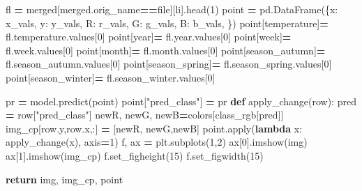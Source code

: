 \documentclass[
]{article}
\newenvironment{Shaded}{\begin{snugshade}}{\end{snugshade}}
\newcommand{\BuiltInTok}[1]{#1}
\newcommand{\ControlFlowTok}[1]{\textcolor[rgb]{0.13,0.29,0.53}{\textbf{#1}}}
\newcommand{\DecValTok}[1]{\textcolor[rgb]{0.00,0.00,0.81}{#1}}
\newcommand{\KeywordTok}[1]{\textcolor[rgb]{0.13,0.29,0.53}{\textbf{#1}}}
\newcommand{\NormalTok}[1]{#1}
\newcommand{\OperatorTok}[1]{\textcolor[rgb]{0.81,0.36,0.00}{\textbf{#1}}}
\newcommand{\StringTok}[1]{\textcolor[rgb]{0.31,0.60,0.02}{#1}}
\begin{document}
\begin{Shaded}
\begin{Highlighting}[]
\NormalTok{    fl }\OperatorTok{=}\NormalTok{ merged[merged.orig\_name}\OperatorTok{==}\BuiltInTok{file}\NormalTok{][li].head(}\DecValTok{1}\NormalTok{)}
\NormalTok{    point }\OperatorTok{=}\NormalTok{ pd.DataFrame(\{}\StringTok{\textquotesingle{}x\textquotesingle{}}\NormalTok{: x\_vals,}
     \StringTok{\textquotesingle{}y\textquotesingle{}}\NormalTok{: y\_vals,}
     \StringTok{\textquotesingle{}R\textquotesingle{}}\NormalTok{: r\_vals,}
     \StringTok{\textquotesingle{}G\textquotesingle{}}\NormalTok{: g\_vals,}
     \StringTok{\textquotesingle{}B\textquotesingle{}}\NormalTok{: b\_vals,}
\NormalTok{    \})}
\NormalTok{    point[}\StringTok{\textquotesingle{}temperature\textquotesingle{}}\NormalTok{]}\OperatorTok{=}\NormalTok{ fl.temperature.values[}\DecValTok{0}\NormalTok{]}
\NormalTok{    point[}\StringTok{\textquotesingle{}year\textquotesingle{}}\NormalTok{]}\OperatorTok{=}\NormalTok{ fl.year.values[}\DecValTok{0}\NormalTok{]}
\NormalTok{    point[}\StringTok{\textquotesingle{}week\textquotesingle{}}\NormalTok{]}\OperatorTok{=}\NormalTok{ fl.week.values[}\DecValTok{0}\NormalTok{]}
\NormalTok{    point[}\StringTok{\textquotesingle{}month\textquotesingle{}}\NormalTok{]}\OperatorTok{=}\NormalTok{ fl.month.values[}\DecValTok{0}\NormalTok{]}
\NormalTok{    point[}\StringTok{\textquotesingle{}season\_autumn\textquotesingle{}}\NormalTok{]}\OperatorTok{=}\NormalTok{ fl.season\_autumn.values[}\DecValTok{0}\NormalTok{]}
\NormalTok{    point[}\StringTok{\textquotesingle{}season\_spring\textquotesingle{}}\NormalTok{]}\OperatorTok{=}\NormalTok{ fl.season\_spring.values[}\DecValTok{0}\NormalTok{]}
\NormalTok{    point[}\StringTok{\textquotesingle{}season\_winter\textquotesingle{}}\NormalTok{]}\OperatorTok{=}\NormalTok{ fl.season\_winter.values[}\DecValTok{0}\NormalTok{]}
    
\NormalTok{    pr }\OperatorTok{=}\NormalTok{ model.predict(point)}
\NormalTok{    point[}\StringTok{"pred\_class"}\NormalTok{] }\OperatorTok{=}\NormalTok{ pr}
    \KeywordTok{def}\NormalTok{ apply\_change(row):}
\NormalTok{        pred }\OperatorTok{=}\NormalTok{ row[}\StringTok{"pred\_class"}\NormalTok{]}
\NormalTok{        newR, newG, newB}\OperatorTok{=}\NormalTok{colors[class\_rgb[pred]]}
\NormalTok{        img\_cp[row.y,row.x,:] }\OperatorTok{=}\NormalTok{ [newR, newG,newB]}
\NormalTok{    point.}\BuiltInTok{apply}\NormalTok{(}\KeywordTok{lambda}\NormalTok{ x: apply\_change(x), axis}\OperatorTok{=}\DecValTok{1}\NormalTok{)}
\NormalTok{    f, ax }\OperatorTok{=}\NormalTok{ plt.subplots(}\DecValTok{1}\NormalTok{,}\DecValTok{2}\NormalTok{)}
\NormalTok{    ax[}\DecValTok{0}\NormalTok{].imshow(img)}
\NormalTok{    ax[}\DecValTok{1}\NormalTok{].imshow(img\_cp)}
\NormalTok{    f.set\_figheight(}\DecValTok{15}\NormalTok{)}
\NormalTok{    f.set\_figwidth(}\DecValTok{15}\NormalTok{)}

    \ControlFlowTok{return}\NormalTok{ img, img\_cp, point}
\end{Highlighting}
\end{Shaded}
\end{document}
